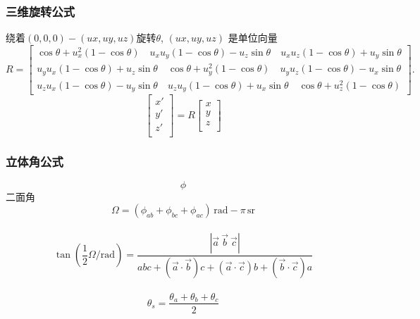 \subsubsection{三维旋转公式}
绕着$(0,0,0)-(ux,uy,uz)$旋转$\theta$, $(ux,uy,uz)$ 是单位向量
\[
R = \begin{bmatrix} \cos \theta +u_x^2 \left(1-\cos \theta\right) \quad u_x u_y \left(1-\cos \theta\right) - u_z \sin \theta \quad u_x u_z \left(1-\cos \theta\right) + u_y \sin \theta \\ u_y u_x \left(1-\cos \theta\right) + u_z \sin \theta \quad \cos \theta + u_y^2\left(1-\cos \theta\right) \quad u_y u_z \left(1-\cos \theta\right) - u_x \sin \theta \\ u_z u_x \left(1-\cos \theta\right) - u_y \sin \theta \quad u_z u_y \left(1-\cos \theta\right) + u_x \sin \theta \quad \cos \theta + u_z^2\left(1-\cos \theta\right) 
\end{bmatrix}.
\]
\[
\begin{bmatrix}
x' \\
y' \\
z' \\
\end{bmatrix} = R
\begin{bmatrix}
x \\
y \\
z \\
\end{bmatrix}
\]
\subsubsection{立体角公式}
\[ \phi \] 二面角\\
\[ \Omega = \left(\phi_{ab} + \phi_{bc} + \phi_{ac}\right)\,\mathrm{rad} - \pi\,\mathrm{sr} \]\\
\[\tan \left( \frac{1}{2} \Omega/\mathrm{rad} \right) =
  \frac{\left|\vec a\ \vec b\ \vec c\right|}{abc + \left(\vec a \cdot \vec b\right)c + \left(\vec a \cdot \vec c\right)b + \left(\vec b \cdot \vec c\right)a}\]\\
\[\theta_s = \frac {\theta_a + \theta_b + \theta_c}{2}\]\\
